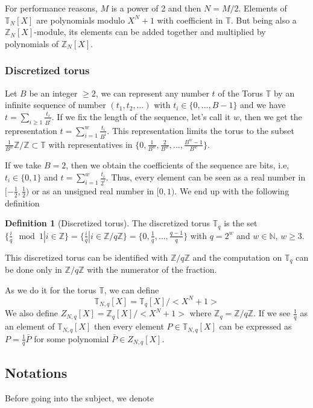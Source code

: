 \documentclass{article}
\newcommand{\Z}{\mathbb{Z}}
\newcommand{\N}{\mathbb{N}}
\newcommand{\T}{\mathbb{T}}
\theoremstyle{definition}
\newtheorem{definition}{Definition}[section]
\theoremstyle{Theorem}
\begin{document}
For performance reasons, $M$ is a power of 2 and then $N = M/2$. Elements of $\T_N[X]$ are polynomials modulo $X^N + 1$ with coefficient in $\T$. But being also a $\Z_N[X]$-module, its elements can be added together and multiplied by polynomials of $\Z_N[X]$.

\subsubsection{Discretized torus}

Let $B$ be an integer $\geq2$, we can represent any number $t$ of the Torus $\T$ by an infinite sequence of number $(t_1,t_2,\ldots)$ with $t_i\in\{0,\ldots,B-1\}$ and we have $t = \sum_{i\geq1}\frac{t_i}{B^i}$. If we fix the length of the sequence, let's call it $w$, then we get the representation $t = \sum_{i=1}^{w}\frac{t_i}{B^i}$. This representation limits the torus to the subset $\frac{1}{B^w}\Z/\Z \subset \T$ with representatives in $\{0,\frac{1}{B^w},\frac{2}{B^w},\ldots,\frac{B^w-1}{B^w}\}$.

If we take $B = 2$, then we obtain the coefficients of the sequence are bits, i.e, $t_i\in\{0,1\}$ and $t = \sum_{i=1}^{w}\frac{t_i}{2^i}$. Thus, every element can be seen as a real number in $[-\frac{1}{2},\frac{1}{2})$ or as an unsigned real number in $[0,1)$. We end up with the following definition 

\begin{definition}[Discretized torus]
    The discretized torus $\T_q$ is the set $\{\frac{i}{q} \mod 1| i \in \Z\}= \{\frac{i}{q} | i \in \Z/q\Z\}= \{0,\frac{1}{q},\ldots,\frac{q-1}{q}\}$ with $q=2^w$ and $w\in\N$, $w\geq3$.
\end{definition}

This discretized torus can be identified with $\Z/q\Z$ and the computation on $\T_q$ can be done only in $\Z/q\Z$ with the numerator of the fraction.

As we do it for the torus $\T$, we can define 
$$\T_{N,q}[X] = \T_q[X]/<X^N+1>$$
We also define $Z_{N,q}[X] = \Z_q[X]/<X^N+1>$ where $\Z_q = \Z/q\Z$. If we see $\frac{1}{q}$ as an element of $\T_{N,q}[X]$ then every element $P\in \T_{N,q}[X]$ can be expressed as $P = \frac{1}{q}\bar{P}$ for some polynomial $\bar{P}\in Z_{N,q}[X]$.

\subsection{Notations}

Before going into the subject, we denote 
\end{document}
